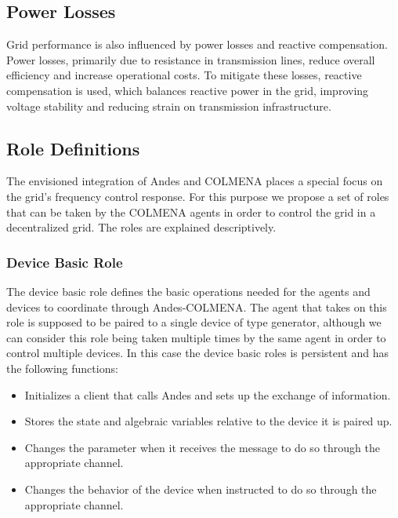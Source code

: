 \documentclass{article}
\begin{document}
\subsection*{Power Losses}

Grid performance is also influenced by power losses and reactive compensation. Power losses, primarily due to resistance in transmission lines, reduce overall efficiency and increase operational costs. To mitigate these losses, reactive compensation is used, which balances reactive power in the grid, improving voltage stability and reducing strain on transmission infrastructure. 

\subsection{Role Definitions}

The envisioned integration of Andes and COLMENA places a special focus on the grid's frequency control response. For this purpose we propose a set of roles that can be taken by the COLMENA agents in order to control the grid in a decentralized grid. The roles are explained descriptively.  

\subsubsection*{Device Basic Role}

The device basic role defines the basic operations needed for the agents and devices to coordinate through Andes-COLMENA. The agent that takes on this role is supposed to be paired to a single device of type generator, although we can consider this role being taken multiple times by the same agent in order to control multiple devices. In this case the device basic roles is persistent and has the following functions:

 \begin{itemize}
     \item Initializes a client that calls Andes and sets up the exchange of information.
     \item Stores the state and algebraic variables relative to the device it is paired up.
     \item Changes the parameter when it receives the message to do so through the appropriate channel.
     \item Changes the behavior of the device when instructed to do so through the appropriate channel.
 \end{itemize}
\end{document}
